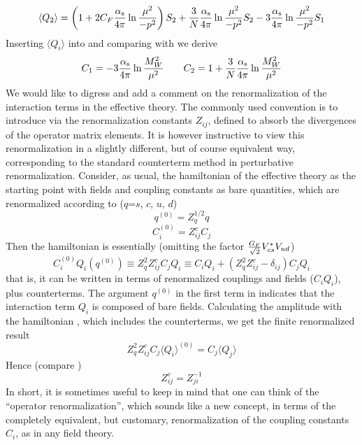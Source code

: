 \begin{equation}\label{q2re}
\langle Q_2\rangle=\left(1+2C_F \frac{\alpha_{\rm s}}{4 \pi}\ln{\mu^2\over -p^2}
\right)S_2+{3\over N}\frac{\alpha_{\rm s}}{4 \pi}\ln{\mu^2\over -p^2}S_2-
3\frac{\alpha_{\rm s}}{4 \pi}\ln{\mu^2\over -p^2} S_1   \end{equation}
Inserting $\langle Q_i\rangle$ into  and comparing with 
we derive
\begin{equation}\label{c12}
C_1=-3\frac{\alpha_{\rm s}}{4 \pi}\ln{M^2_W\over\mu^2}   \qquad
C_2=1+{3\over N}\frac{\alpha_{\rm s}}{4 \pi}\ln{M^2_W\over\mu^2}   \end{equation}
We would like to digress and add a comment on the renormalization of
the interaction terms in the effective theory. The commonly used
convention is to introduce via  the renormalization constants
$Z_{ij}$, defined to absorb the divergences of the operator matrix
elements. It is however instructive to view this renormalization in
a slightly different, but of course equivalent way, corresponding to
the standard counter\-term method in perturbative renormalization.
Consider, as usual, the hamiltonian of the effective theory as the
starting point with fields and coupling constants as bare quantities,
which are renormalized according to ($q$=$s$, $c$, $u$, $d$)
\begin{equation}\label{q0z2}
q^{(0)}=Z^{1/2}_q q  \end{equation}
\begin{equation}\label{c0zc}  C^{(0)}_i=Z^c_{ij} C_j \end{equation}
Then the hamiltonian  is essentially (omitting the factor
${G_F\over\sqrt{2}}V^\ast_{cs}V_{ud}$)
\begin{equation}\label{ctcq}
C^{(0)}_iQ_i(q^{(0)})\equiv Z^2_qZ^c_{ij} C_jQ_i\equiv
C_iQ_i+(Z^2_q Z^c_{ij}-\delta_{ij})C_jQ_i  \end{equation}
that is, it can be written in terms of renormalized couplings and
fields ($C_iQ_i$), plus coun\-ter\-terms. The argument $q^{(0)}$ in the
first term in  indicates that the interaction term $Q_i$ is
composed of bare fields. Calculating the amplitude with the
hamiltonian , which includes the counterterms, we get the
finite renormalized result
\begin{equation}\label{zqzc}
Z^2_qZ^c_{ij} C_j\langle Q_i\rangle^{(0)}=
C_j\langle Q_j\rangle     \end{equation}
Hence (compare )
\begin{equation}\label{zcz}
Z^c_{ij}=Z^{-1}_{ji}  \end{equation}
In short, it is sometimes useful to keep in mind that one can think
of the ``operator renormalization'', which sounds like a new concept,
in terms of the completely equivalent, but customary, renormalization
of the coupling constants $C_i$, as in any field theory.

